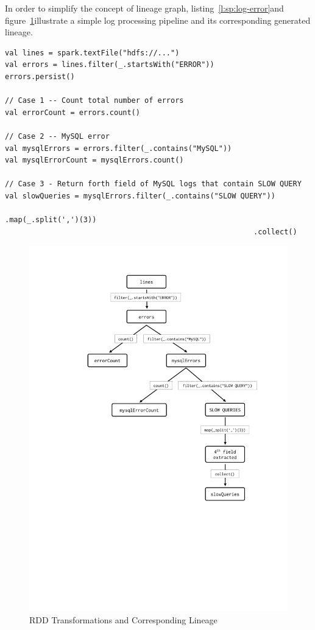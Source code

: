 In order to simplify the concept of lineage graph, listing~\ref{l:sp:log-error}\footnotemark and figure~\ref{fig:spark-lineage-sample}\footnotemark[\value{footnote}] illustrate a simple log processing pipeline and its corresponding generated lineage.
\begin{lstlisting}[float=h, caption={Parsing errors in log files from HDFS},label={l:sp:log-error},captionpos=b,morekeywords={val}]
val lines = spark.textFile("hdfs://...")
val errors = lines.filter(_.startsWith("ERROR"))
errors.persist()

// Case 1 -- Count total number of errors
val errorCount = errors.count()

// Case 2 -- MySQL error
val mysqlErrors = errors.filter(_.contains("MySQL"))
val mysqlErrorCount = mysqlErrors.count()

// Case 3 - Return forth field of MySQL logs that contain SLOW QUERY
val slowQueries = mysqlErrors.filter(_.contains("SLOW QUERY"))
                                                         .map(_.split(',')(3))
                                                         .collect()
\end{lstlisting}
\begin{figure}[p]
    \centering
    \includegraphics[clip,trim=4.5cm 9cm 2.2cm 2.2cm]{spark-lineage-sample.pdf}
    \caption[RDD Transformations and Corresponding Lineage]{RDD Transformations and Corresponding Lineage}
    \label{fig:spark-lineage-sample}
\end{figure}

